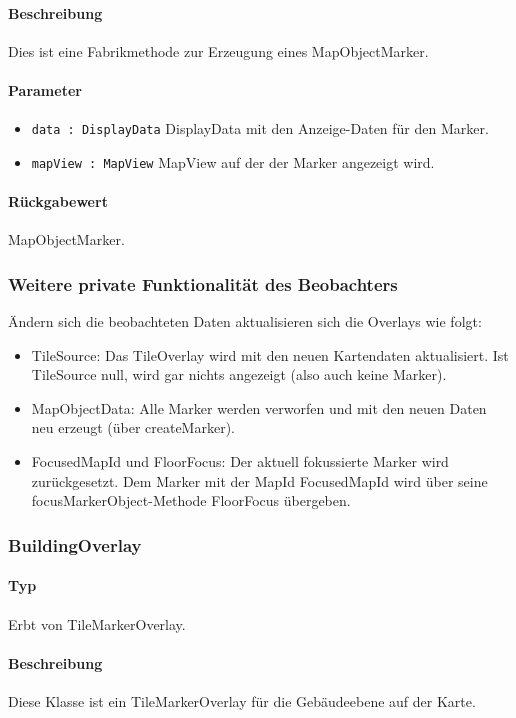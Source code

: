 \paragraph*{Beschreibung}
Dies ist eine Fabrikmethode zur Erzeugung eines MapObjectMarker.
\paragraph*{Parameter}
\begin{itemize}
    \item \texttt{data : DisplayData} DisplayData mit den Anzeige-Daten für den Marker.
    \item \texttt{mapView : MapView} MapView auf der der Marker angezeigt wird.
\end{itemize}
\paragraph*{Rückgabewert}
MapObjectMarker.


\subsubsection*{Weitere private Funktionalität des Beobachters}
Ändern sich die beobachteten Daten aktualisieren sich die Overlays wie folgt:
\begin{itemize}
    \item TileSource: Das TileOverlay wird mit den neuen Kartendaten aktualisiert.
    Ist TileSource null, wird gar nichts angezeigt (also auch keine Marker).
    \item MapObjectData: Alle Marker werden verworfen und mit den neuen Daten neu erzeugt (über createMarker).
    \item FocusedMapId und FloorFocus: Der aktuell fokussierte Marker wird zurückgesetzt.
    Dem Marker mit der MapId FocusedMapId wird über seine focusMarkerObject-Methode FloorFocus übergeben.
\end{itemize}

\subsubsection{BuildingOverlay}
\paragraph*{Typ}
Erbt von TileMarkerOverlay.
\paragraph*{Beschreibung}
Diese Klasse ist ein TileMarkerOverlay für die Gebäudeebene auf der Karte.

